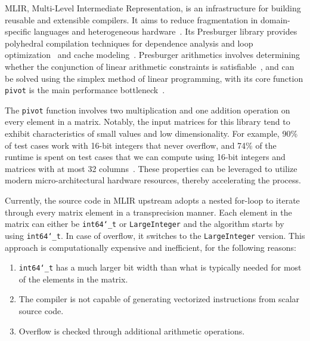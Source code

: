 \documentclass[logo,bsc,singlespacing,parskip]{infthesis}
\newcommand{\dtlong}{\texttt{int64\char`_t}}
\newcommand{\pivot}{\texttt{pivot}}
\begin{document}
MLIR, Multi-Level Intermediate Representation, is an infrastructure for building
reusable and extensible compilers. It aims to reduce fragmentation in domain-specific
languages and heterogeneous hardware~\cite{mlir}. Its Presburger
library provides polyhedral compilation techniques for dependence analysis
and loop optimization~\cite{mliraffine} and cache modeling~\cite{CacheModel}.
Presburger arithmetics involves determining whether the conjunction of linear
arithmetic constraints is satisfiable~\cite{SMLPPA}, and can be solved using the
simplex method of linear programming, with its core function \pivot{} is the
main performance bottleneck~\cite{FPL1}. 

The \texttt{pivot} function involves two multiplication and one addition
operation on every element in a matrix. Notably, the input matrices for this
library tend to exhibit characteristics of small values and low dimensionality.
For example, 90\% of test cases work with 16-bit integers that never overflow,
and 74\% of the runtime is spent on test cases that we can compute using
16-bit integers and matrices with at most 32 columns~\cite{FPL2}. These
properties can be leveraged to utilize modern micro-architectural
hardware resources, thereby accelerating the process.

Currently, the source code in MLIR upstream adopts a nested for-loop to iterate
through every matrix element in a transprecision manner. Each element in
the matrix can either be \dtlong{} or \texttt{LargeInteger} and the
algorithm starts by using \dtlong{}. In case of overflow, it switches to
the \texttt{LargeInteger} version. This approach is computationally expensive
and inefficient, for the following reasons: 
\begin{enumerate}

\item \dtlong{} has a much larger bit width than what is typically
needed for most of the elements in the matrix.

\item The compiler is not capable of generating vectorized instructions from
scalar source code.

\item Overflow is checked through additional arithmetic
operations.

\end{enumerate}
\end{document}
